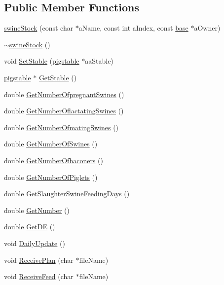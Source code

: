 \subsection*{Public Member Functions}
\begin{DoxyCompactItemize}
\item 
\hyperlink{classswine_stock_a135e6f925e3ab22a15d9f87cf8b93a1e}{swineStock} (const char $\ast$aName, const int aIndex, const \hyperlink{classbase}{base} $\ast$aOwner)
\item 
\hyperlink{classswine_stock_ab6aacb4f9339a5d1238fbc76d857f4ed}{$\sim$swineStock} ()
\item 
void \hyperlink{classswine_stock_a6e44014411d40ef8496be5bc0090c2a4}{SetStable} (\hyperlink{classpigstable}{pigstable} $\ast$aaStable)
\item 
\hyperlink{classpigstable}{pigstable} $\ast$ \hyperlink{classswine_stock_af63160db1074a36becd0b5dfb0859945}{GetStable} ()
\item 
double \hyperlink{classswine_stock_a31ae4f1e9e626423441cad2bc1328a02}{GetNumberOfpregnantSwines} ()
\item 
double \hyperlink{classswine_stock_ab15ee6eea81d51b18f910e2304d62837}{GetNumberOflactatingSwines} ()
\item 
double \hyperlink{classswine_stock_a6797f1e6e9c86ac73c08571cf8c6e3f3}{GetNumberOfmatingSwines} ()
\item 
double \hyperlink{classswine_stock_a10887b6ededdf74adaf16a193239a8e0}{GetNumberOfSwines} ()
\item 
double \hyperlink{classswine_stock_a36ba5282d1d0d0b36d04958d77c74552}{GetNumberOfbaconers} ()
\item 
double \hyperlink{classswine_stock_a7f919fd97ef7455eb5d124e82e0667ad}{GetNumberOfPiglets} ()
\item 
double \hyperlink{classswine_stock_a52a84a2970940255ff2b74c768d418e3}{GetSlaughterSwineFeedingDays} ()
\item 
double \hyperlink{classswine_stock_a810cd4f4ffc068a42edf008b1288606d}{GetNumber} ()
\item 
double \hyperlink{classswine_stock_ac7b5455c4b474d3be67c17ce9d7f61ea}{GetDE} ()
\item 
void \hyperlink{classswine_stock_ae8e9dfd9c03e9ba170c697f7376b82bd}{DailyUpdate} ()
\item 
void \hyperlink{classswine_stock_acf5744db1aac193ee2af257c4554918d}{ReceivePlan} (char $\ast$fileName)
\item 
void \hyperlink{classswine_stock_ae8818ed344f35b8decfb6ab9d1719952}{ReceiveFeed} (char $\ast$fileName)

\end{DoxyCompactItemize}
